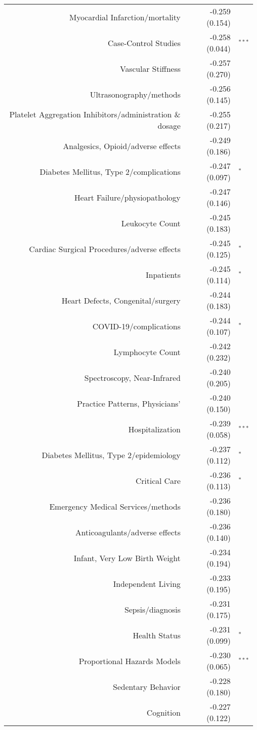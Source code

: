 \begin{longtable}[l]{rr@{}l@{ }}
Myocardial Infarction/mortality & -0.259 (0.154) & $^{}$\\
Case-Control Studies & -0.258 (0.044) & $^{***}$\\
Vascular Stiffness & -0.257 (0.270) & $^{}$\\
Ultrasonography/methods & -0.256 (0.145) & $^{}$\\
Platelet Aggregation Inhibitors/administration \& dosage & -0.255 (0.217) & $^{}$\\
Analgesics, Opioid/adverse effects & -0.249 (0.186) & $^{}$\\
Diabetes Mellitus, Type 2/complications & -0.247 (0.097) & $^{*}$\\
Heart Failure/physiopathology & -0.247 (0.146) & $^{}$\\
Leukocyte Count & -0.245 (0.183) & $^{}$\\
Cardiac Surgical Procedures/adverse effects & -0.245 (0.125) & $^{*}$\\
Inpatients & -0.245 (0.114) & $^{*}$\\
Heart Defects, Congenital/surgery & -0.244 (0.183) & $^{}$\\
COVID-19/complications & -0.244 (0.107) & $^{*}$\\
Lymphocyte Count & -0.242 (0.232) & $^{}$\\
Spectroscopy, Near-Infrared & -0.240 (0.205) & $^{}$\\
Practice Patterns, Physicians' & -0.240 (0.150) & $^{}$\\
Hospitalization & -0.239 (0.058) & $^{***}$\\
Diabetes Mellitus, Type 2/epidemiology & -0.237 (0.112) & $^{*}$\\
Critical Care & -0.236 (0.113) & $^{*}$\\
Emergency Medical Services/methods & -0.236 (0.180) & $^{}$\\
Anticoagulants/adverse effects & -0.236 (0.140) & $^{}$\\
Infant, Very Low Birth Weight & -0.234 (0.194) & $^{}$\\
Independent Living & -0.233 (0.195) & $^{}$\\
Sepsis/diagnosis & -0.231 (0.175) & $^{}$\\
Health Status & -0.231 (0.099) & $^{*}$\\
Proportional Hazards Models & -0.230 (0.065) & $^{***}$\\
Sedentary Behavior & -0.228 (0.180) & $^{}$\\
Cognition & -0.227 (0.122) & $^{}$\\

\end{longtable}
